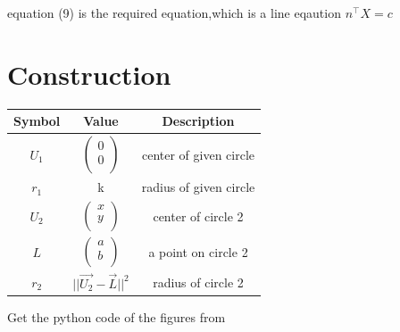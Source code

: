 \documentclass[journal,12pt,twocolumn]{IEEEtran}
\begin{document}
\unboldmath 

equation (9) is the required equation,which is a line eqaution
\boldmath
${n}^{\top}X=c$
\unboldmath
\section*{Construction}
\centering
\vspace{0.2cm}
{
\setlength\extrarowheight{2pt}
\begin{tabular}{|c|c|c|}
	\hline
	\textbf{Symbol}&\textbf{Value}&\textbf{Description}\\
	\hline
	$U_1$ & $\begin{pmatrix}0 \\ 0 \\ \end{pmatrix}$ & center of given circle\\
	\hline
	$r_1$ & k & radius of given circle\\
	\hline
	$U_2$ & $\begin{pmatrix}x \\ y \\ \end{pmatrix}$ & center of circle 2\\
	\hline
	$L$ & $\begin{pmatrix}a \\ b \\ \end{pmatrix}$ & a point on  circle 2\\
	\hline
	$r_2$ & $||{\vec{U_2}-\vec{L}}||^2$ & radius of circle 2\\
	\hline
\end{tabular}
}

\vspace{0.6cm}
Get the python code of the figures from
\begin{table}[h]
\large
\centering
{}


\end{table}
\end{document}
